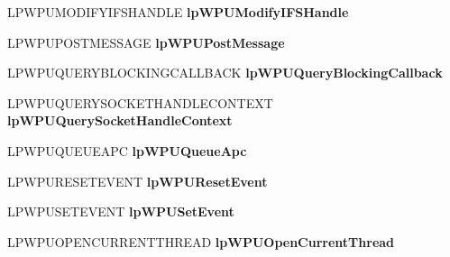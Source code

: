 \begin{DoxyCompactItemize}
\item 
\mbox{\label{struct___w_s_p_u_p_c_a_l_l_t_a_b_l_e_e_x_a4f9d8854bfd302f7fb90cbe4b19b2805}} 
L\+P\+W\+P\+U\+M\+O\+D\+I\+F\+Y\+I\+F\+S\+H\+A\+N\+D\+LE {\bfseries lp\+W\+P\+U\+Modify\+I\+F\+S\+Handle}
\item 
\mbox{\label{struct___w_s_p_u_p_c_a_l_l_t_a_b_l_e_e_x_a286d7ddd76e1c1c2cd59e301aa4a7906}} 
L\+P\+W\+P\+U\+P\+O\+S\+T\+M\+E\+S\+S\+A\+GE {\bfseries lp\+W\+P\+U\+Post\+Message}
\item 
\mbox{\label{struct___w_s_p_u_p_c_a_l_l_t_a_b_l_e_e_x_a11684ca2ba701baabff4e82d2286135f}} 
L\+P\+W\+P\+U\+Q\+U\+E\+R\+Y\+B\+L\+O\+C\+K\+I\+N\+G\+C\+A\+L\+L\+B\+A\+CK {\bfseries lp\+W\+P\+U\+Query\+Blocking\+Callback}
\item 
\mbox{\label{struct___w_s_p_u_p_c_a_l_l_t_a_b_l_e_e_x_a278bda8b692fd8a89235da7f51f39299}} 
L\+P\+W\+P\+U\+Q\+U\+E\+R\+Y\+S\+O\+C\+K\+E\+T\+H\+A\+N\+D\+L\+E\+C\+O\+N\+T\+E\+XT {\bfseries lp\+W\+P\+U\+Query\+Socket\+Handle\+Context}
\item 
\mbox{\label{struct___w_s_p_u_p_c_a_l_l_t_a_b_l_e_e_x_a064b615c61f7916ba47eced63b5899a2}} 
L\+P\+W\+P\+U\+Q\+U\+E\+U\+E\+A\+PC {\bfseries lp\+W\+P\+U\+Queue\+Apc}
\item 
\mbox{\label{struct___w_s_p_u_p_c_a_l_l_t_a_b_l_e_e_x_a474ef25c725d4560332f846a555cde37}} 
L\+P\+W\+P\+U\+R\+E\+S\+E\+T\+E\+V\+E\+NT {\bfseries lp\+W\+P\+U\+Reset\+Event}
\item 
\mbox{\label{struct___w_s_p_u_p_c_a_l_l_t_a_b_l_e_e_x_a30d3e1a889c63e51e533265ef4be5264}} 
L\+P\+W\+P\+U\+S\+E\+T\+E\+V\+E\+NT {\bfseries lp\+W\+P\+U\+Set\+Event}
\item 
\mbox{\label{struct___w_s_p_u_p_c_a_l_l_t_a_b_l_e_e_x_a96cae029e2413f6746063f02c42c70cf}} 
L\+P\+W\+P\+U\+O\+P\+E\+N\+C\+U\+R\+R\+E\+N\+T\+T\+H\+R\+E\+AD {\bfseries lp\+W\+P\+U\+Open\+Current\+Thread}
\item 

\end{DoxyCompactItemize}
